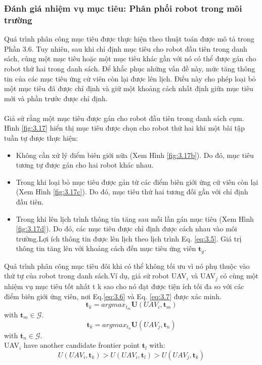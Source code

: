 \documentclass[11pt,openany]{book}
\begin{document}
\subsubsection{Đánh giá nhiệm vụ mục tiêu: Phân phối robot trong môi trường}
Quá trình phân công mục tiêu được thực hiện theo thuật toán được mô tả trong Phần 3.6. Tuy nhiên, sau khi chỉ định mục tiêu cho robot đầu tiên trong danh sách, cùng một mục tiêu hoặc một mục tiêu khác gần với nó có thể được gán cho robot thứ hai trong danh sách. Để khắc phục những vấn đề này, mức tăng thông tin của các mục tiêu ứng cử viên còn lại được lên lịch. Điều này cho phép loại bỏ một mục tiêu đã được chỉ định và giữ một khoảng cách nhất định giữa mục tiêu mới và phần trước được chỉ định.\\\\
Giả sử rằng một mục tiêu được gán cho robot đầu tiên trong danh sách cụm. Hình \ref{fig:3.17} hiển thị mục tiêu được chọn cho robot thứ hai khi một bài tập tuần tự được thực hiện:
\begin{itemize}
    \item Không cần xử lý điểm biên giới nữa (Xem Hình \ref{fig:3.17b}). Do đó, mục tiêu tương tự được gán cho hai robot khác nhau.
    \item Trong khi loại bỏ mục tiêu được gán từ các điểm biên giới ứng cử viên còn lại (Xem Hình \ref{fig:3.17c}). Do đó, mục tiêu thứ hai tương đối gần với chỉ định đầu tiên.
    \item Trong khi lên lịch trình thông tin tăng sau mỗi lần gán mục tiêu (Xem Hình \ref{fig:3.17d}). Do đó, các mục tiêu được chỉ định được cách nhau vào môi trường.Lợi ích thông tin được lên lịch theo lịch trình Eq. \ref{eq:3.5}. Giá trị thông tin tăng lên với khoảng cách đến mục tiêu ứng viên $\mathbf{t}_g$.
\end{itemize}
Quá trình phân công mục tiêu đôi khi có thể không tối ưu vì nó phụ thuộc vào thứ tự của robot trong danh sách.Ví dụ, giả sử robot UAV$_i$ và UAV$_j$ có cùng một nhiệm vụ mục tiêu tốt nhất t k sao cho nó đạt được tiện ích tối đa so với các điểm biên giới ứng viên, nơi Eq.\ref{eq:3.6} và Eq. \ref{eq:3.7} được xác minh.
\begin{equation}\label{eq:3.6}
    \mathbf{t}_k=argmax_{t_m}\mathbf{U}(UAV_i,\mathbf{t}_m)
\end{equation}
with $\mathbf{t}_m \in \mathcal{G}$.
\begin{equation}\label{eq:3.7}
    \mathbf{t}_k=argmax_{t_n}\mathbf{U}(UAV_j, \mathbf{t}_n)
\end{equation}
with $\mathbf{t}_n \in \mathcal{G}$.\\
UAV$_i$ have another candidate frontier point $\mathbf{t}_l$ with:
\begin{equation}\label{eq:3.8}
    \mathbf{\mathit{U}}(UAV_i, \mathbf{t}_k) > \mathbf{\mathit{U}}(UAV_i,\mathbf{t}_l) > \mathbf{\mathit{U}}(UAV_j, \mathbf{t}_k)
\end{equation}
\end{document}
